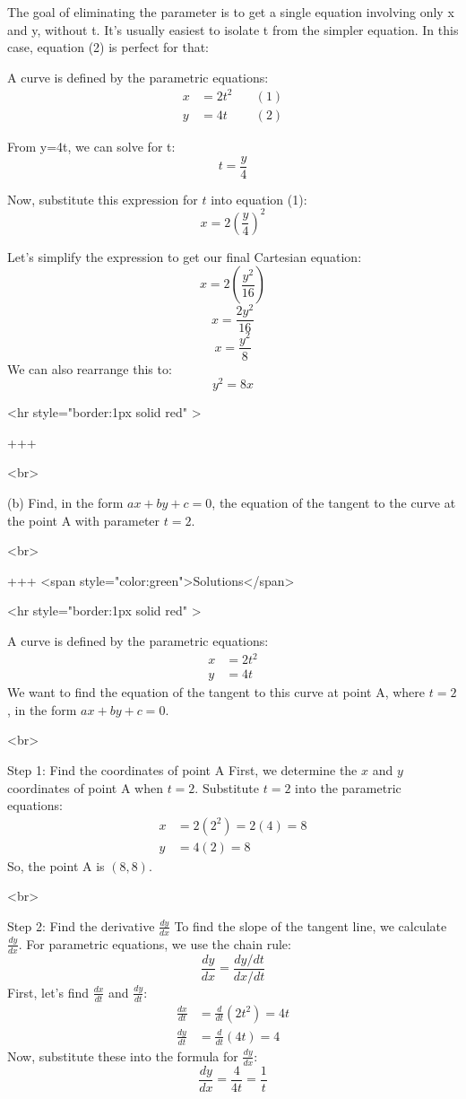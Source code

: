 The goal of eliminating the parameter is to get a single equation involving only x and y, without t. It's usually easiest to isolate t from the simpler equation. In this case, equation (2) is perfect for that:

A curve is defined by the parametric equations:
\begin{align*} x &= 2t^2 \quad &(1) \\ y &= 4t \quad &(2)\end{align*}

From y=4t, we can solve for t:
$$
t = \frac{y}{4}
$$

Now, substitute this expression for $t$ into equation (1):
$$
x = 2\left(\frac{y}{4}\right)^2
$$

Let's simplify the expression to get our final Cartesian equation:
$$
x = 2\left(\frac{y^2}{16}\right)
$$
$$
x = \frac{2y^2}{16}
$$
$$
x = \frac{y^2}{8}
$$
We can also rearrange this to:
$$
y^2 = 8x
$$

<hr style="border:1px solid red" >

+++

<br>

(b) Find, in the form $a x+b y+c=0$, the equation of the tangent to the curve at the point A with parameter $t=2$.

<br>

+++ <span style="color:green">Solutions</span>

<hr style="border:1px solid red" >

A curve is defined by the parametric equations:
\begin{align*} x &= 2t^2 \\ y &= 4t \end{align*}
We want to find the equation of the tangent to this curve at point A, where $t=2$, in the form $ax+by+c=0$.

<br>

Step 1: Find the coordinates of point A
First, we determine the $x$ and $y$ coordinates of point A when $t=2$.
Substitute $t=2$ into the parametric equations:
\begin{align*} x &= 2(2^2) = 2(4) = 8 \\ y &= 4(2) = 8 \end{align*}
So, the point A is $(8, 8)$.

<br>

Step 2: Find the derivative $\frac{dy}{dx}$
To find the slope of the tangent line, we calculate $\frac{dy}{dx}$. For parametric equations, we use the chain rule:
$$ \frac{dy}{dx} = \frac{dy/dt}{dx/dt} $$
First, let's find $\frac{dx}{dt}$ and $\frac{dy}{dt}$:
\begin{align*} \frac{dx}{dt} &= \frac{d}{dt}(2t^2) = 4t \\ \frac{dy}{dt} &= \frac{d}{dt}(4t) = 4 \end{align*}
Now, substitute these into the formula for $\frac{dy}{dx}$:
$$ \frac{dy}{dx} = \frac{4}{4t} = \frac{1}{t} $$

